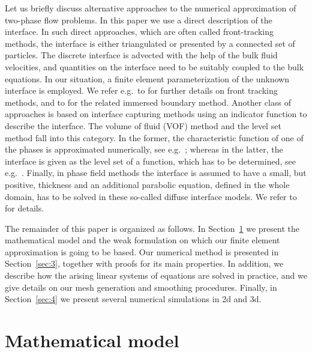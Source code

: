 \documentclass[a4paper,11pt,onecolumn]{article}
\begin{document}
Let us briefly discuss alternative approaches to the numerical approximation of
two-phase flow problems. In this paper we use a direct description of the
interface.  In such direct
approaches, which are often called front-tracking methods, the interface is
either triangulated or presented by a connected set of particles. The discrete
interface is advected with the help of the bulk fluid velocities, and
quantities on the interface need to be suitably coupled to the bulk equations.
In our situation, a finite element parameterization of the unknown interface
is employed.
We refer e.g.\ to
\cite{UnverdiT92,Bansch01,Tryggvason_etal01,GanesanMT07,GanesanT08,spurious}
for further details on front tracking methods,
and to \cite{LevequeL97,Peskin02} for the related immersed
boundary method. Another class of approaches is based on interface capturing
methods using an indicator function to describe the interface. The volume of
fluid (VOF) method and the level set method fall into this category. In the
former, the characteristic function of one of the phases is approximated
numerically, see e.g.\ \cite{HirtN81,RenardyR02,Popinet09}; whereas in the
latter, the interface is given as the level set of a function, which has to be
determined, see e.g.\ \cite{SussmanSO94,Sethian99,OsherF03,GrossR07}.
Finally, in phase
field methods the interface is assumed to have a small, but positive, thickness
and an additional parabolic equation, defined in the whole domain, has to be
solved in these so-called diffuse interface models. We refer to
\cite{HohenbergH77,AndersonMW98,LowengrubT98,Feng06,KaySW08,AbelsGG12,GrunK14}
for details.

The remainder of this paper is organized as follows. In Section~\ref{sec:2}
we present the mathematical model and the weak formulation on which our finite
element approximation is going to be based. Our numerical method is presented
in Section~\ref{sec:3}, together with proofs for its main properties. In
addition, we describe how the arising linear systems of equations are solved in
practice, and we give details on our mesh generation and smoothing procedures.
Finally, in Section~\ref{sec:4} we present several numerical simulations in 2d
and 3d.

\section{Mathematical model} \label{sec:2}
\end{document}
